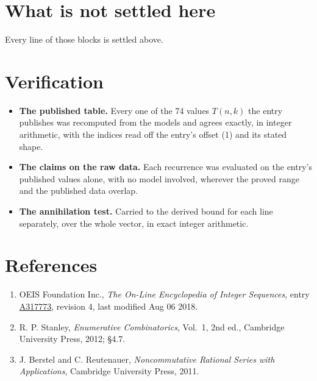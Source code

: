 \documentclass[11pt]{article}
\theoremstyle{definition}
\begin{document}
\section{What is not settled here}

Every line of those blocks is settled above.

\section{Verification}

\begin{itemize}

\item {\bfseries The published table.} Every one of the 74 values $T(n,k)$ the entry publishes was recomputed from the models and agrees exactly, in integer arithmetic, with the indices read off the entry's offset (1) and its stated shape.

\item {\bfseries The claims on the raw data.} Each recurrence was evaluated on the entry's published values alone, with no model involved, wherever the proved range and the published data overlap.

\item {\bfseries The annihilation test.} Carried to the derived bound for each line separately, over the whole vector, in exact integer arithmetic.

\end{itemize}

\section{References}

\begin{enumerate}

\item OEIS Foundation Inc., \emph{The On-Line Encyclopedia of Integer Sequences}, entry \href{https://oeis.org/A317773}{A317773}, revision 4, last modified Aug 06 2018.

\item R. P. Stanley, \emph{Enumerative Combinatorics}, Vol.~1, 2nd ed., Cambridge University Press, 2012; \S4.7.

\item J. Berstel and C. Reutenauer, \emph{Noncommutative Rational Series with Applications}, Cambridge University Press, 2011.

\end{enumerate}
\end{document}
